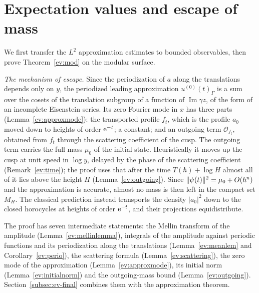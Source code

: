 \section{Expectation values and escape of mass}\label{sec:expect}

We first transfer the $L^2$ approximation estimates to bounded observables, then prove Theorem~\ref{ev:mod} on the
modular surface.

\medskip\noindent\emph{The mechanism of escape.} Since the periodization of $a$ along the translations depends only on $y$,
the periodized leading approximation $u^{(0)}(t)_\Gamma$ is a sum over the cosets of the translation subgroup of a function of
$\operatorname{Im}\gamma z$, of the form of an incomplete Eisenstein series. Its zero Fourier mode in $x$ has three parts
(Lemma~\ref{ev:approxmode}): the transported profile $f_t$, which is the profile $a_0$ moved down to heights of order $\mathrm{e}^{-t}$;
a constant; and an outgoing term $\mathcal O_{f_t}$, obtained from $f_t$ through the scattering coefficient of the cusp. The
outgoing term carries the full mass $\mu_0$ of the initial state. Heuristically it moves up the cusp at unit speed in $\log y$,
delayed by the phase of the scattering coefficient (Remark~\ref{ev:time}); the proof uses that after the time $T(\hbar)+\log H$
almost all of it lies above the height $H$ (Lemma~\ref{ev:outgoing}). Since $\lVert \psi(t)\rVert^2=\mu_0+O(\hbar^n)$ and the
approximation is accurate, almost no mass is then left in the compact set $M_H$. The classical prediction instead transports the
density $|a_0|^2$ down to the closed horocycles at heights of order $\mathrm{e}^{-t}$, and their projections equidistribute.

The proof has seven intermediate statements: the Mellin transform of the amplitude
(Lemma~\ref{ev:mellinlemma}), integrals of the amplitude against periodic functions and its periodization along the translations
(Lemma~\ref{ev:meanlem} and Corollary~\ref{ev:perio}), the scattering formula (Lemma~\ref{ev:scattering}), the zero mode of the
approximation (Lemma~\ref{ev:approxmode}), its initial norm (Lemma~\ref{ev:initialnorm}) and the outgoing-mass bound
(Lemma~\ref{ev:outgoing}). Section~\ref{subsec:ev-final} combines them with the approximation theorem.

